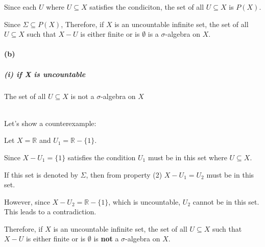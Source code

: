 \documentclass[12pt]{article}
\begin{document}
\par \hspace*{1em}Since each \( U \) where \( U \subseteq X \) satisfies the condiciton, the set of all \( U \subseteq X \) is \( P(X) \). \\
\par \hspace*{1em}Since \( \Sigma \subseteq P(X) \), Therefore, if \( X \) is an uncountable infinite set, the set of all \( U \subseteq X \) such that \( X - U \) is either finite or is \(\emptyset\) is a \( \sigma \)-algebra on \( X \).


\paragraph{(b)}
\subparagraph{(i) if X is uncountable}
The set of all \( U \subseteq X \) is not a \(\sigma\)-algebra on \(X\) \\ \\
\par \hspace*{1em}Let's show a counterexample: \\
\par \hspace*{1em}Let \( X = \mathbb{R} \) and \( U_1 = \mathbb{R} - \{1\} \). \\
\par \hspace*{1em}Since \( X - U_1 = \{1\} \) satisfies the condition \( U_1 \) must be in this set where \( U \subseteq X \).\\
\par \hspace*{1em}If this set is denoted by \( \Sigma \), then from property (2) \( X - U_1 = U_2 \) must be in this set.\\

\par \hspace*{1em}However, since \( X - U_2 = \mathbb{R} - \{1\} \), which is uncountable, \( U_2 \) cannot be in this set. This leads to a contradiction.\\

\par \hspace*{1em}Therefore, if \( X \) is an uncountable infinite set, the set of all \( U \subseteq X \) such that \( X - U \) is either finite or is \(\emptyset\) is \textbf{not}  a \( \sigma \)-algebra on \( X \).\\
\end{document}
